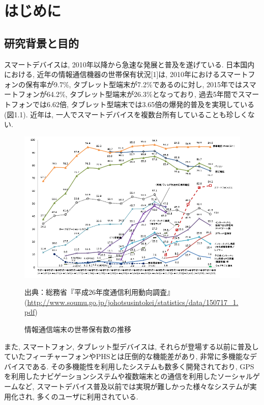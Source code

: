 \chapter{はじめに}
\label{chap:introduction}

\section{研究背景と目的}
スマートデバイスは, 2010年以降から急速な発展と普及を遂げている.
日本国内における, 近年の情報通信機器の世帯保有状況[1]は, 2010年におけるスマートフォンの保有率が9.7\%, タブレット型端末が7.2\%であるのに対し, 2015年ではスマートフォンが64.2\%, タブレット型端末が26.3\%となっており, 過去5年間でスマートフォンでは6.62倍, タブレット型端末では3.65倍の爆発的普及を実現している(図1.1).
近年は, 一人でスマートデバイスを複数台所有していることも珍しくない.

\begin{figure}[tb]
\begin{center}
\includegraphics[width=17cm]{fig/n4301010.png}
\caption{情報通信端末の世帯保有数の推移}
\end{center}
\begin{flushright}
出典：総務省『平成26年度通信利用動向調査』
(\url{http://www.soumu.go.jp/johotsusintokei/statistics/data/150717_1.pdf})
\end{flushright}
\end{figure}

また, スマートフォン, タブレット型デバイスは, それらが登場する以前に普及していたフィーチャーフォンやPHSとは圧倒的な機能差があり, 非常に多機能なデバイスである.
その多機能性を利用したシステムも数多く開発されており, GPSを利用したナビゲーションシステムや複数端末との通信を利用したソーシャルゲームなど, スマートデバイス普及以前では実現が難しかった様々なシステムが実用化され, 多くのユーザに利用されている.

